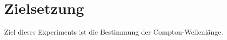 \section{Zielsetzung}
\label{sec:Zielsetzung}

Ziel dieses Experiments ist die Bestimmung der Compton-Wellenlänge.